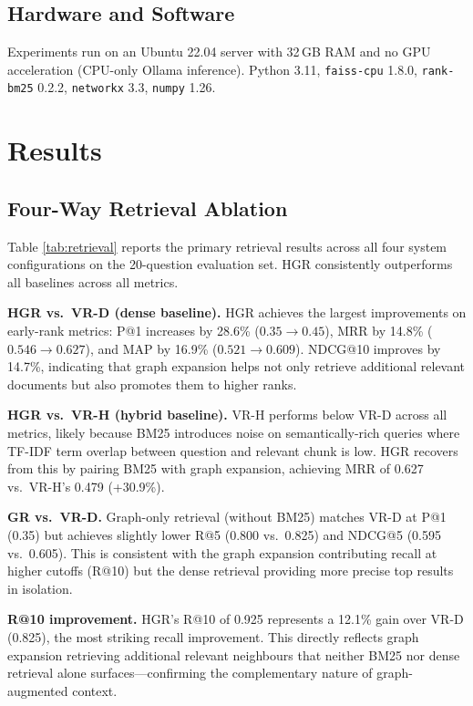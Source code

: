 \documentclass[conference,10pt,twocolumn]{IEEEtran}
\begin{document}
\subsection{Hardware and Software}

Experiments run on an Ubuntu 22.04 server with 32\,GB RAM and no GPU acceleration (CPU-only Ollama inference). Python 3.11, \texttt{faiss-cpu} 1.8.0, \texttt{rank-bm25} 0.2.2, \texttt{networkx} 3.3, \texttt{numpy} 1.26.

\section{Results}
\label{sec:results}

\subsection{Four-Way Retrieval Ablation}

Table \ref{tab:retrieval} reports the primary retrieval results across all four system configurations on the 20-question evaluation set. HGR consistently outperforms all baselines across all metrics.

\textbf{HGR vs.\ VR-D (dense baseline).} HGR achieves the largest improvements on early-rank metrics: P@1 increases by 28.6\% ($0.35 \to 0.45$), MRR by 14.8\% ($0.546 \to 0.627$), and MAP by 16.9\% ($0.521 \to 0.609$). NDCG@10 improves by 14.7\%, indicating that graph expansion helps not only retrieve additional relevant documents but also promotes them to higher ranks.

\textbf{HGR vs.\ VR-H (hybrid baseline).} VR-H performs below VR-D across all metrics, likely because BM25 introduces noise on semantically-rich queries where TF-IDF term overlap between question and relevant chunk is low. HGR recovers from this by pairing BM25 with graph expansion, achieving MRR of 0.627 vs.\ VR-H's 0.479 (+30.9\%).

\textbf{GR vs.\ VR-D.} Graph-only retrieval (without BM25) matches VR-D at P@1 (0.35) but achieves slightly lower R@5 (0.800 vs.\ 0.825) and NDCG@5 (0.595 vs.\ 0.605). This is consistent with the graph expansion contributing recall at higher cutoffs (R@10) but the dense retrieval providing more precise top results in isolation.

\textbf{R@10 improvement.} HGR's R@10 of 0.925 represents a 12.1\% gain over VR-D (0.825), the most striking recall improvement. This directly reflects graph expansion retrieving additional relevant neighbours that neither BM25 nor dense retrieval alone surfaces---confirming the complementary nature of graph-augmented context.
\end{document}
